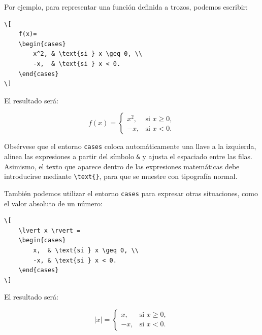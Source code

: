 \documentclass[11pt,a4paper]{article}
\theoremstyle{plain}
\theoremstyle{definition}
\theoremstyle{remark}
\theoremstyle{exercise}
\begin{document}
\medskip

Por ejemplo, para representar una función definida a trozos, podemos escribir:

\begin{lstlisting}
\[
	f(x)=
	\begin{cases}
		x^2, & \text{si } x \geq 0, \\
		-x,  & \text{si } x < 0.
	\end{cases}
\]
\end{lstlisting}

\noindent El resultado será:

\begin{paginarecuadrada}
\[
f(x)=
\begin{cases}
x^2, & \text{si } x \geq 0, \\
-x,  & \text{si } x < 0.
\end{cases}
\]
\end{paginarecuadrada}


Obsérvese que el entorno \texttt{cases} coloca automáticamente una llave a la izquierda, alinea las expresiones a partir del símbolo \texttt{\&} y ajusta el espaciado entre las filas. Asimismo, el texto que aparece dentro de las expresiones matemáticas debe introducirse mediante \texttt{\textbackslash text\{\}}, para que se muestre con tipografía normal.

\medskip

También podemos utilizar el entorno \texttt{cases} para expresar otras situaciones, como el valor absoluto de un número:

\begin{lstlisting}
\[
	\lvert x \rvert =
	\begin{cases}
		x,  & \text{si } x \geq 0, \\
		-x, & \text{si } x < 0.
	\end{cases}
\]
\end{lstlisting}

\noindent El resultado será:

\begin{paginarecuadrada}
\[
	\lvert x \rvert =
	\begin{cases}
		x,  & \text{si } x \geq 0,\\
		-x, & \text{si } x < 0.
	\end{cases}
\]
\end{paginarecuadrada}
\end{document}
